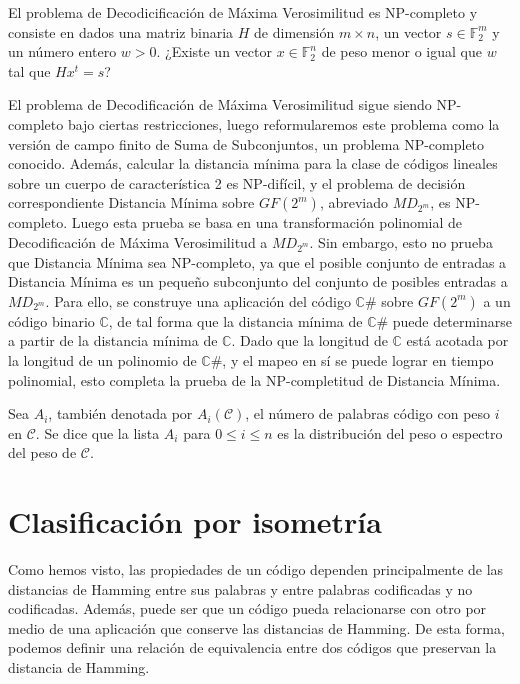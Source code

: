 El problema de Decodicificación de Máxima Verosimilitud es NP-completo y consiste en dados una matriz binaria $H$ de dimensión $m \times n$, un vector $s \in \mathbb{F}_2^m$ y un número entero $w > 0$. ¿Existe un vector $x \in \mathbb{F}_2^n$ de peso menor o igual que $w$ tal que $Hx^t = s$?

El problema de Decodificación de Máxima Verosimilitud sigue siendo NP-completo bajo ciertas restricciones, luego reformularemos este problema como la versión de campo finito de Suma de Subconjuntos, un problema NP-completo conocido. Además, calcular la distancia mínima para la clase de códigos lineales sobre un cuerpo de característica 2 es NP-difícil, y el problema de decisión correspondiente Distancia Mínima sobre $GF(2^m)$, abreviado $MD_{2^m}$, es NP-completo. Luego esta prueba se basa en una transformación polinomial de Decodificación de Máxima Verosimilitud a $MD_{2^m}$. Sin embargo, esto no prueba que Distancia Mínima sea NP-completo, ya que el posible conjunto de entradas a Distancia Mínima es un pequeño subconjunto del conjunto de posibles entradas a $MD_{2^m}$. Para ello, se construye una aplicación del código $\mathbb{C\#}$ sobre $GF(2^m)$ a un código binario $\mathbb{C}$, de tal forma que la distancia mínima de $\mathbb{C\#}$ puede determinarse a partir de la distancia mínima de $\mathbb{C}$. Dado que la longitud de $\mathbb{C}$ está acotada por la longitud de un polinomio de $\mathbb{C\#}$, y el mapeo en sí se puede lograr en tiempo polinomial, esto completa la prueba de la NP-completitud de Distancia Mínima.


\begin{definition}
    Sea $A_i$, también denotada por $A_i(\mathcal{C})$, el número de palabras código con peso $i$ en $\mathcal{C}$. Se dice que la lista $A_i$ para $0 \leq i \leq n$ es la distribución del peso o espectro del peso de $\mathcal{C}$.
\end{definition}

\section{Clasificación por isometría}

Como hemos visto, las propiedades de un código dependen principalmente de las distancias de Hamming entre sus palabras y entre palabras codificadas y no codificadas. Además, puede ser que un código pueda relacionarse con otro por medio de una aplicación que conserve las distancias de Hamming. De esta forma, podemos definir una relación de equivalencia entre dos códigos que preservan la distancia de Hamming.

